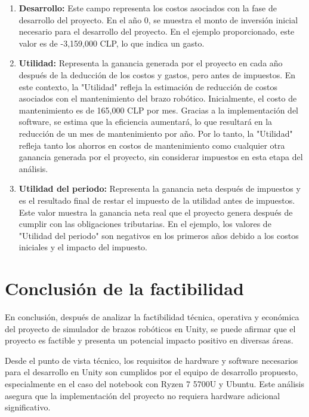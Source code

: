 \begin{enumerate}[label=\arabic*.]
    \item \textbf{Desarrollo:} Este campo representa los costos asociados con la fase de desarrollo del proyecto. En el año 0, se muestra el monto de inversión inicial necesario para el desarrollo del proyecto. En el ejemplo proporcionado, este valor es de -3,159,000 CLP, lo que indica un gasto.
    
    \item \textbf{Utilidad:} Representa la ganancia generada por el proyecto en cada año después de la deducción de los costos y gastos, pero antes de impuestos. En este contexto, la "Utilidad" refleja la estimación de reducción de costos asociados con el mantenimiento del brazo robótico. Inicialmente, el costo de mantenimiento es de 165,000 CLP por mes. Gracias a la implementación del software, se estima que la eficiencia aumentará, lo que resultará en la reducción de un mes de mantenimiento por año. Por lo tanto, la "Utilidad" refleja tanto los ahorros en costos de mantenimiento como cualquier otra ganancia generada por el proyecto, sin considerar impuestos en esta etapa del análisis.
    
    \item \textbf{Utilidad del periodo:} Representa la ganancia neta después de impuestos y es el resultado final de restar el impuesto de la utilidad antes de impuestos. Este valor muestra la ganancia neta real que el proyecto genera después de cumplir con las obligaciones tributarias. En el ejemplo, los valores de "Utilidad del periodo" son negativos en los primeros años debido a los costos iniciales y el impacto del impuesto.
\end{enumerate}

\clearpage
\section{Conclusión de la factibilidad}

En conclusión, después de analizar la factibilidad técnica, operativa y económica del proyecto de simulador de brazos robóticos en Unity, se puede afirmar que el proyecto es factible y presenta un potencial impacto positivo en diversas áreas.

Desde el punto de vista técnico, los requisitos de hardware y software necesarios para el desarrollo en Unity son cumplidos por el equipo de desarrollo propuesto, especialmente en el caso del notebook con Ryzen 7 5700U y Ubuntu. Este análisis asegura que la implementación del proyecto no requiera hardware adicional significativo.

